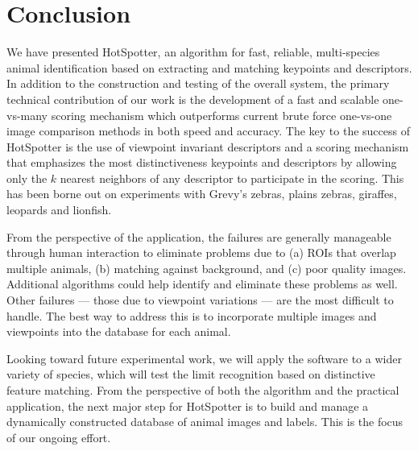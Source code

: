 \section{Conclusion}

We have presented HotSpotter, an algorithm for fast,
reliable, multi-species animal identification based on
extracting and matching keypoints and descriptors.  In addition to the
construction and testing of the overall system, the primary technical
contribution of our work is the development of a fast and scalable
one-vs-many scoring mechanism which outperforms current brute force
one-vs-one image comparison methods in both speed and accuracy.  The
key to the success of HotSpotter is the use of viewpoint invariant
descriptors and a scoring mechanism that emphasizes the most
distinctiveness keypoints and descriptors by allowing only the $k$
nearest neighbors of any descriptor to participate in the scoring.
This has been borne out on experiments with Grevy's zebras, plains
zebras, giraffes, leopards and lionfish.

From the perspective of the application, the failures are generally
manageable through human interaction to eliminate problems due to (a)
ROIs that overlap multiple animals, (b) matching
against background, and (c) poor quality images. Additional algorithms
could help identify and eliminate these problems as well.  Other
failures --- those due to viewpoint variations --- are the most difficult to handle. The
best way to address this is to incorporate multiple images and
viewpoints into the database for each animal.

Looking toward future experimental work, we will  
  apply the software to a wider variety of species, which will test the limit 
  recognition based on distinctive feature matching. From the perspective 
of both the algorithm and the practical application,
 the next major step for HotSpotter is to build and manage a dynamically
constructed database of animal images and labels.  This is the focus of
our ongoing effort.




